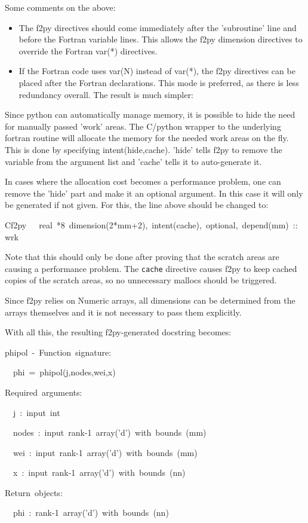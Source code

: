 Some comments on the above:

\begin{itemize}
\item The f2py directives should come immediately after the 'subroutine'
line and before the Fortran variable lines. This allows the f2py dimension
directives to override the Fortran var({*}) directives.
\item If the Fortran code uses var(N) instead of var({*}), the f2py directives
can be placed after the Fortran declarations. This mode is preferred,
as there is less redundancy overall. The result is much simpler: 
\end{itemize}




Since python can automatically manage memory, it is possible to hide
the need for manually passed 'work' areas. The C/python wrapper to
the underlying fortran routine will allocate the memory for the needed
work areas on the fly. This is done by specifying intent(hide,cache).
'hide' tells f2py to remove the variable from the argument list and
'cache' tells it to auto-generate it.

In cases where the allocation cost becomes a performance problem,
one can remove the 'hide' part and make it an optional argument. In
this case it will only be generated if not given. For this, the line
above should be changed to:

\begin{lyxcode}
{\small Cf2py~~~real~{*}8~dimension(2{*}mm+2),~intent(cache),~optional,~depend(mm)~::~wrk~}{\small \par}
\end{lyxcode}
Note that this should only be done after proving that the scratch
areas are causing a performance problem. The \texttt{cache} directive
causes f2py to keep cached copies of the scratch areas, so no unnecessary
mallocs should be triggered.

Since f2py relies on Numeric arrays, all dimensions can be determined
from the arrays themselves and it is not necessary to pass them explicitly.

With all this, the resulting f2py-generated docstring becomes: 

\begin{lyxcode}
phipol~-~Function~signature:

~~phi~=~phipol(j,nodes,wei,x)

Required~arguments:

~~j~:~input~int

~~nodes~:~input~rank-1~array('d')~with~bounds~(mm)

~~wei~:~input~rank-1~array('d')~with~bounds~(mm)

~~x~:~input~rank-1~array('d')~with~bounds~(nn)

Return~objects:

~~phi~:~rank-1~array('d')~with~bounds~(nn)
\end{lyxcode}


